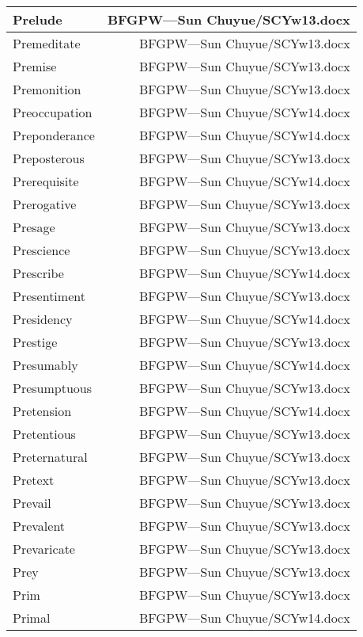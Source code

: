 \documentclass{article}
\begin{document}
\begin{center}
\begin{longtable}{|l|r|}
\hline
Prelude  &  BFGPW---Sun Chuyue/SCYw13.docx\\  
\hline
Premeditate  &  BFGPW---Sun Chuyue/SCYw13.docx\\  
\hline
Premise  &  BFGPW---Sun Chuyue/SCYw13.docx\\  
\hline
Premonition  &  BFGPW---Sun Chuyue/SCYw13.docx\\  
\hline
Preoccupation  &  BFGPW---Sun Chuyue/SCYw14.docx\\  
\hline
Preponderance  &  BFGPW---Sun Chuyue/SCYw14.docx\\  
\hline
Preposterous  &  BFGPW---Sun Chuyue/SCYw13.docx\\  
\hline
Prerequisite  &  BFGPW---Sun Chuyue/SCYw14.docx\\  
\hline
Prerogative  &  BFGPW---Sun Chuyue/SCYw13.docx\\  
\hline
Presage  &  BFGPW---Sun Chuyue/SCYw13.docx\\  
\hline
Prescience  &  BFGPW---Sun Chuyue/SCYw13.docx\\  
\hline
Prescribe  &  BFGPW---Sun Chuyue/SCYw14.docx\\  
\hline
Presentiment  &  BFGPW---Sun Chuyue/SCYw13.docx\\  
\hline
Presidency  &  BFGPW---Sun Chuyue/SCYw14.docx\\  
\hline
Prestige  &  BFGPW---Sun Chuyue/SCYw13.docx\\  
\hline
Presumably  &  BFGPW---Sun Chuyue/SCYw14.docx\\  
\hline
Presumptuous  &  BFGPW---Sun Chuyue/SCYw13.docx\\  
\hline
Pretension  &  BFGPW---Sun Chuyue/SCYw14.docx\\  
\hline
Pretentious  &  BFGPW---Sun Chuyue/SCYw13.docx\\  
\hline
Preternatural  &  BFGPW---Sun Chuyue/SCYw13.docx\\  
\hline
Pretext  &  BFGPW---Sun Chuyue/SCYw13.docx\\  
\hline
Prevail  &  BFGPW---Sun Chuyue/SCYw13.docx\\  
\hline
Prevalent  &  BFGPW---Sun Chuyue/SCYw13.docx\\  
\hline
Prevaricate  &  BFGPW---Sun Chuyue/SCYw13.docx\\  
\hline
Prey  &  BFGPW---Sun Chuyue/SCYw13.docx\\  
\hline
Prim  &  BFGPW---Sun Chuyue/SCYw13.docx\\  
\hline
Primal  &  BFGPW---Sun Chuyue/SCYw14.docx\\  

\end{longtable}
\end{center}
\end{document}
